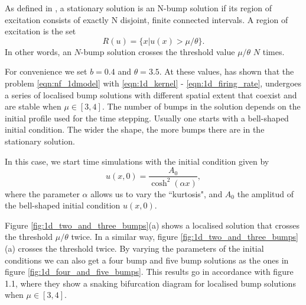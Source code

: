 \documentclass{uonmathreport}
\begin{document}
As defined in \cite{LaingCarloR.2002MBia}, a stationary solution is an N-bump solution if its region of excitation consists of exactly N disjoint, finite connected intervals. A region of excitation is the set
\begin{equation}
	R(u) = \{x | u(x)>\mu/\theta \}.
\end{equation}
In other words, an $N$-bump solution crosses the threshold value $\mu/\theta$ $N$ times.

For convenience we set $b=0.4$ and $\theta = 3.5$. At these values, \cite{rankin2014continuation} has shown that the problem \ref{eqn:nf_1dmodel} with \ref{eqn:1d_kernel} - \ref{eqn:1d_firing_rate}, undergoes a series of localised bump solutions with different spatial extent that coexist and are stable when $\mu \in [3,4]$. The number of bumps in the solution depends on the initial profile used for the time stepping. Usually one starts with a bell-shaped initial condition. The wider the shape, the more bumps there are in the stationary solution.

In this case, we start time simulations with the initial condition given by
\begin{equation}
	u(x,0) = \frac{A_0}{\cosh^2(\alpha x)},
\end{equation}  
where the parameter $\alpha$ allows us to vary the ``kurtosis", and $A_0$ the amplitud of the bell-shaped initial condition $u(x,0)$.

Figure \ref{fig:1d_two_and_three_bumps}(a) shows a localised solution that crosses the threshold $\mu/\theta$ twice. In a similar way, figure \ref{fig:1d_two_and_three_bumps}(a) crosses the threshold twice. By varying the parameters of the initial conditions we can also get a four bump and five bump solutions as the ones in figure \ref{fig:1d_four_and_five_bumps}. This results go in accordance with \cite{rankin2014continuation} figure 1.1, where they show a snaking bifurcation diagram for localised bump solutions when $\mu \in [3,4]$.
\end{document}
